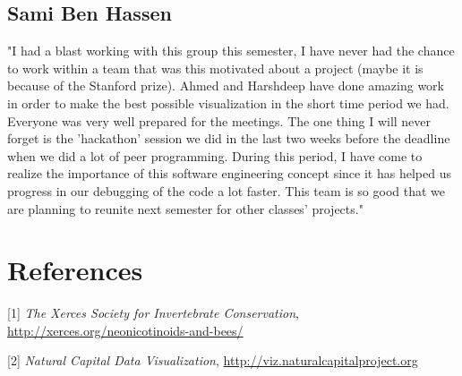 \documentclass[12pt]{article}
\begin{document}
\subsection{Sami Ben Hassen}
"I had a blast working with this group this semester, I have never had the chance to work within a team that was this motivated about a project (maybe it is because of the Stanford prize). Ahmed and Harshdeep have done amazing work in order to make the best possible visualization in the short time period we had. Everyone was very well prepared for the meetings. The one thing I will never forget is the 'hackathon' session we did in the last two weeks before the deadline when we did a lot of peer programming. During this period, I have come to realize the importance of this software engineering concept since it has helped us progress in our debugging of the code a lot faster. This team is so good that we are planning to reunite next semester for other classes’ projects."
\section*{References}
[1] \textit{The Xerces Society for Invertebrate Conservation}, \newline \url{http://xerces.org/neonicotinoids-and-bees/} \newline 

[2] \textit{Natural Capital Data Visualization}, \newline \url{http://viz.naturalcapitalproject.org}
\end{document}
